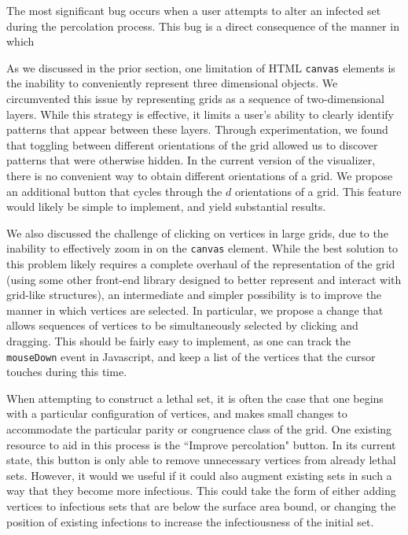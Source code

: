 The most significant bug occurs when a user attempts to alter an infected set during the percolation process. This bug is a direct consequence of the manner in which 

As we discussed in the prior section, one limitation of HTML \texttt{canvas} elements is the inability to conveniently represent three dimensional objects. We circumvented this issue by representing grids as a sequence of two-dimensional layers. While this strategy is effective, it limits a user's ability to clearly identify patterns that appear between these layers. Through experimentation, we found that toggling between different orientations of the grid allowed us to discover patterns that were otherwise hidden. In the current version of the visualizer, there is no convenient way to obtain different orientations of a grid. We propose an additional button that cycles through the $d$ orientations of a grid. This feature would likely be simple to implement, and yield substantial results.

We also discussed the challenge of clicking on vertices in large grids, due to the inability to effectively zoom in on the \texttt{canvas} element. While the best solution to this problem likely requires a complete overhaul of the representation of the grid (using some other front-end library designed to better represent and interact with grid-like structures), an intermediate and simpler possibility is to improve the manner in which vertices are selected. In particular, we propose a change that allows sequences of vertices to be simultaneously selected by clicking and dragging. This should be fairly easy to implement, as one can track the \texttt{mouseDown} event in Javascript, and keep a list of the vertices that the cursor touches during this time.  

When attempting to construct a lethal set, it is often the case that one begins with a particular configuration of vertices, and makes small changes to accommodate the particular parity or congruence class of the grid. One existing resource to aid in this process is the ``Improve percolation" button. In its current state, this button is only able to remove unnecessary vertices from already lethal sets. However, it would we useful if it could also augment existing sets in such a way that they become more infectious. This could take the form of either adding vertices to infectious sets that are below the surface area bound, or changing the position of existing infections to increase the infectiousness of the initial set. 

